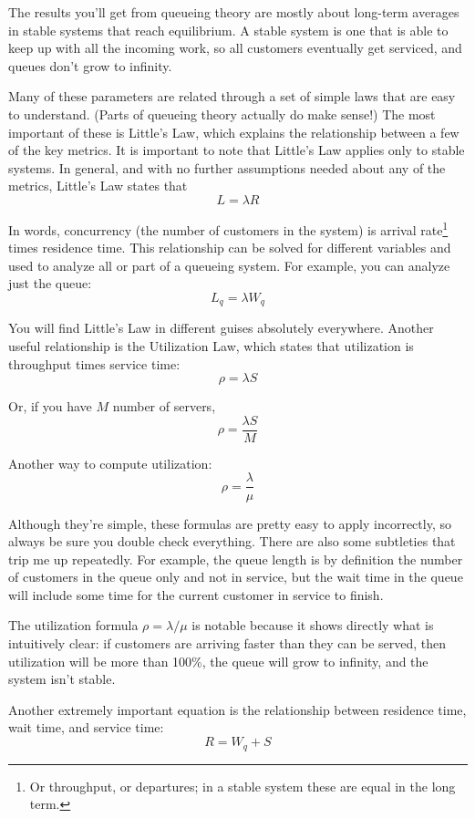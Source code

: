 \documentclass{vivid_layout_pdf}
\begin{document}
The results you'll get from queueing theory are mostly about long-term averages in stable systems that reach equilibrium. A stable system is one that is able to keep up with all the incoming work, so all customers eventually get serviced, and queues don't grow to infinity.

Many of these parameters are related through a set of simple laws that are easy to understand. (Parts of queueing theory actually do make sense!) The most important of these is Little's Law, which explains the relationship between a few of the key metrics. It is important to note that Little's Law applies only to stable systems. In general, and with no further assumptions needed about any of the metrics, Little's Law states that
\[
   L = \lambda R
\]

In words, concurrency (the number of customers in the system) is arrival rate\footnote{Or throughput, or departures; in a stable system these are equal in the long term.} times residence time. This relationship can be solved for different variables and used to analyze all or part of a queueing system. For example, you can analyze just the queue:
\[
  L_q = \lambda  W_q
\]

You will find Little's Law in different guises absolutely everywhere. Another useful relationship is the Utilization Law, which states that utilization is throughput times service time:
\[
 \rho = \lambda  S
\]

Or, if you have $M$ number of servers,
\[
 \rho = \frac{ \lambda S }{M}
\]

Another way to compute utilization:
\[
 \rho = \frac{\lambda}{ \mu}
\]

Although they're simple, these formulas are pretty easy to apply incorrectly, so always be sure you double check everything. There are also some subtleties that trip me up repeatedly. For example, the queue length is by definition the number of customers in the queue only and not in service, but the wait time in the queue will include some time for the current customer in service to finish.

The utilization formula \(\rho = \lambda / \mu\) is notable because it shows directly what is intuitively clear: if customers are arriving faster than they can be served, then utilization will be more than 100\%, the queue will grow to infinity, and the system isn't stable.

Another extremely important equation is the relationship between residence time, wait time, and  service time:
\[
 R = W_q + S
\]
\end{document}
